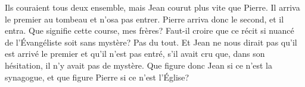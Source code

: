 Ils couraient tous deux ensemble,
	mais Jean courut plus vite que Pierre.
Il arriva le premier au tombeau et n’osa pas entrer.
Pierre arriva donc le second, et il entra.
Que signifie cette course, mes frères?
	Faut-il croire que ce récit si nuancé de l’Évangéliste soit sans mystère?
	Pas du tout.
Et Jean ne nous dirait pas qu’il est arrivé le premier et qu’il n’est pas entré,
	s’il avait cru que, dans son hésitation, il n’y avait pas de mystère.
Que figure donc Jean si ce n’est la synagogue,
	et que figure Pierre si ce n’est l’Église?
